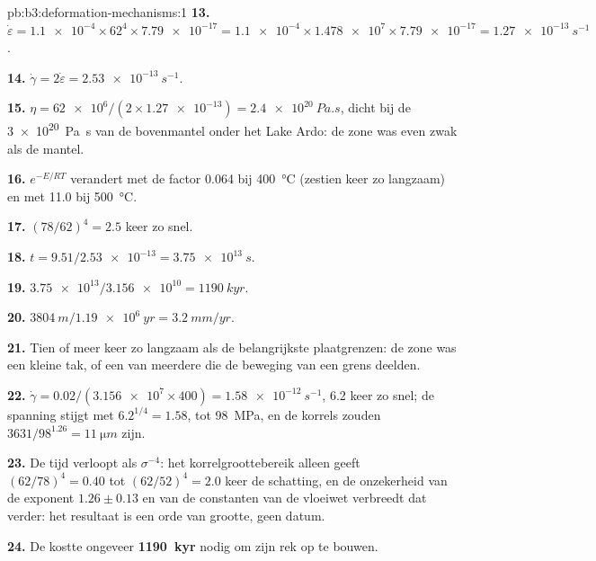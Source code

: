 \begin{solution}{pb:b3:deformation-mechanisms:1}
\textbf{13.} $\dot\varepsilon = \num{1.1e-4}\times62^4\times\num{7.79e-17} =
\num{1.1e-4}\times\num{1.478e7}\times\num{7.79e-17} = \qty{1.27e-13}{s^{-1}}$.

\textbf{14.} $\dot\gamma = 2\dot\varepsilon = \qty{2.53e-13}{s^{-1}}$.

\textbf{15.} $\eta = \num{62e6}/(2\times\num{1.27e-13}) = \qty{2.4e20}{Pa.s}$,
dicht bij de \qty{3e20}{Pa.s} van de bovenmantel onder het Lake Ardo: de zone
was even zwak als de mantel.

\textbf{16.} $e^{-E/RT}$ verandert met de factor 0.064 bij \qty{400}{\celsius}
(zestien keer zo langzaam) en met 11.0 bij \qty{500}{\celsius}.

\textbf{17.} $(78/62)^4 = 2.5$ keer zo snel.

\textbf{18.} $t = 9.51/\num{2.53e-13} = \qty{3.75e13}{s}$.

\textbf{19.} $\num{3.75e13}/\num{3.156e10} = \qty{1190}{kyr}$.

\textbf{20.} $\qty{3804}{m}/\qty{1.19e6}{yr} = \qty{3.2}{mm/yr}$.

\textbf{21.} Tien of meer keer zo langzaam als de belangrijkste plaatgrenzen: de zone
was een kleine tak, of een van meerdere die de beweging van een grens deelden.

\textbf{22.} $\dot\gamma = 0.02/(\num{3.156e7}\times400) = \qty{1.58e-12}{s^{-1}}$,
6.2 keer zo snel; de spanning stijgt met $6.2^{1/4} = 1.58$, tot \qty{98}{MPa}, en
de korrels zouden $3631/98^{1.26} = \qty{11}{\micro m}$ zijn.

\textbf{23.} De tijd verloopt als $\sigma^{-4}$: het korrelgroottebereik alleen geeft
$(62/78)^4 = 0.40$ tot $(62/52)^4 = 2.0$ keer de schatting, en de
onzekerheid van de exponent $1.26 \pm 0.13$ en van de constanten van de vloeiwet
verbreedt dat verder: het resultaat is een orde van grootte, geen datum.

\textbf{24.} De  kostte ongeveer
\textbf{\qty[text-series-to-math=true]{1190}{kyr}} nodig om zijn rek op te bouwen.
\end{solution}
